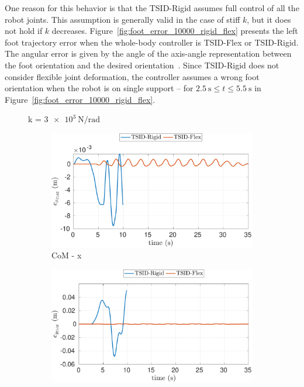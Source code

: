 One reason for this behavior is that the TSID-Rigid assumes full control of all the robot joints. This assumption is generally valid in the case of stiff $k$, but it does not hold if $k$ decreases. Figure~\ref{fig:foot_error_10000_rigid_flex} presents the left foot trajectory error when the whole-body controller is TSID-Flex or TSID-Rigid. The angular error is given by the angle of the axis-angle representation between the foot orientation and the desired orientation~\citep{Huynh2009}. Since TSID-Rigid does not consider flexible joint deformation, the controller assumes a wrong foot orientation when the robot is on single support -- for $ \SI{2.5}{\second} \le t \le  \SI{5.5}{\second}$ in Figure~\ref{fig:foot_error_10000_rigid_flex}.


\begin{figure}[t]
    \begin{myframe}{k = $\SI{3e3}{\newton \per \radian}$}
    \centering
        \begin{subfigure}[b]{0.49\textwidth}
        \centering
        \includegraphics[width=\columnwidth]{chapter_flexible_joints/figures/comparison_3000_com_error_x.pdf}
        \caption{CoM - x}
    \end{subfigure}
    \hfill
    \begin{subfigure}[b]{0.49\textwidth}
        \centering
        \includegraphics[width=\columnwidth]{chapter_flexible_joints/figures/comparison_3000_com_error_y.pdf}

\end{subfigure}
\end{myframe}
\end{figure}
